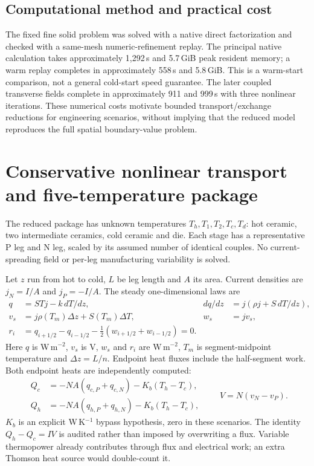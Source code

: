 \documentclass[11pt,a4paper]{article}
\begin{document}
\subsection{Computational method and practical cost}
The fixed fine solid problem was solved with a native direct factorization and checked with a same-mesh numeric-refinement replay. The principal native calculation takes approximately 1,292\,s and 5.7\,GiB peak resident memory; a warm replay completes in approximately 558\,s and 5.8\,GiB. This is a warm-start comparison, not a general cold-start speed guarantee. The later coupled transverse fields complete in approximately 911 and 999\,s with three nonlinear iterations. These numerical costs motivate bounded transport/exchange reductions for engineering scenarios, without implying that the reduced model reproduces the full spatial boundary-value problem.

\clearpage
\section{Conservative nonlinear transport and five-temperature package}
The reduced package has unknown temperatures $T_h,T_1,T_2,T_c,T_d$: hot ceramic, two intermediate ceramics, cold ceramic and die. Each stage has a representative P leg and N leg, scaled by its assumed number of identical couples. No current-spreading field or per-leg manufacturing variability is solved.

Let $z$ run from hot to cold, $L$ be leg length and $A$ its area. Current densities are $j_N=I/A$ and $j_P=-I/A$. The steady one-dimensional laws are
\begin{align}
q&=STj-k\,dT/dz, & dq/dz&=j(\rho j+S\,dT/dz),\\
v_s&=j\rho(T_m)\Delta z+S(T_m)\Delta T, & w_s&=jv_s,\\
r_i&=q_{i+1/2}-q_{i-1/2}-\tfrac12(w_{i+1/2}+w_{i-1/2})=0.
\end{align}
Here $q$ is W\,m$^{-2}$, $v_s$ is V, $w_s$ and $r_i$ are W\,m$^{-2}$, $T_m$ is segment-midpoint temperature and $\Delta z=L/n$. Endpoint heat fluxes include the half-segment work. Both endpoint heats are independently computed:
\begin{equation}
\begin{aligned}Q_c&=-NA(q_{c,P}+q_{c,N})-K_b(T_h-T_c),\\
Q_h&=-NA(q_{h,P}+q_{h,N})-K_b(T_h-T_c),\end{aligned}\qquad V=N(v_N-v_P).
\end{equation}
$K_b$ is an explicit W\,K$^{-1}$ bypass hypothesis, zero in these scenarios. The identity $Q_h-Q_c=IV$ is audited rather than imposed by overwriting a flux. Variable thermopower already contributes through flux and electrical work; an extra Thomson heat source would double-count it.
\end{document}

